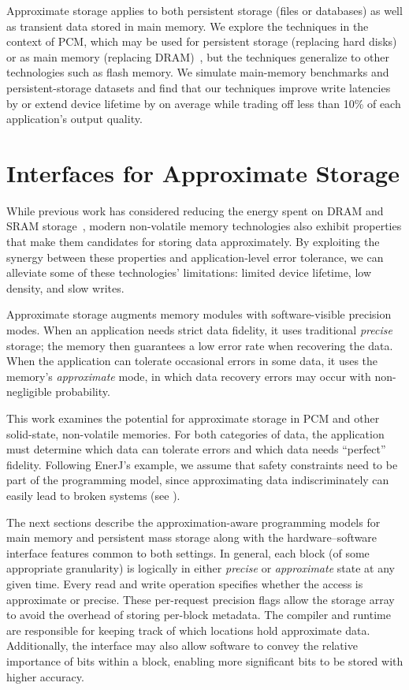 Approximate storage applies to both persistent storage (files or databases) as well as transient
data stored in main memory.
We explore the techniques in the context of PCM, which may be used for
persistent storage (replacing hard disks) or as main memory
(replacing DRAM)~\cite{pcm-dram-alt,durable-pcm-mm,qureshi-pcm-mm},
but the techniques generalize to other technologies such as flash memory.
We simulate main-memory benchmarks and
persistent-storage datasets and find that our techniques improve write
latencies by  or extend device lifetime by
 on
average while trading off less than 10\% of each application's output quality.

\section{Interfaces for Approximate Storage}
\label{approxstorage:sec:idea}

While previous work has considered reducing the energy spent on DRAM
and SRAM storage~\cite{flikker,enerj,truffle}, modern non-volatile
memory technologies also exhibit properties that make them candidates
for storing data approximately. By exploiting the synergy between
these properties and application-level error tolerance, we can alleviate
some of these technologies' limitations: limited device
lifetime, low density, and slow writes.

Approximate storage augments memory modules with software-visible
precision modes. When an application needs strict data fidelity,
it uses traditional \emph{precise} storage; the memory then
guarantees a low error rate when recovering the data. When the
application can tolerate occasional errors in some data, it uses
the memory's \emph{approximate} mode, in which data recovery errors
may occur with non-negligible probability.

This work examines the potential for approximate storage in
PCM and other solid-state, non-volatile memories.
For both categories of data,
the application must determine which data can
tolerate errors and which data needs ``perfect'' fidelity.
Following EnerJ's example, we assume that safety constraints need to be part
of the programming model, since approximating data indiscriminately can easily
lead to broken systems (see ).

The next sections describe the approximation-aware programming
models for main memory and persistent mass storage along with
the hardware--software interface features common to both settings. 
In general,
each block (of some appropriate granularity) is logically in either
\emph{precise} or
\emph{approximate} state at any given time. Every read and write operation specifies
whether the access is approximate or precise.
These per-request precision flags allow the storage array to
avoid the overhead of storing per-block metadata. The
compiler and runtime are responsible for keeping track of which locations hold approximate
data. Additionally, the interface may also allow
software to convey the relative importance of bits within a block, enabling
more significant bits to be stored with higher accuracy.

